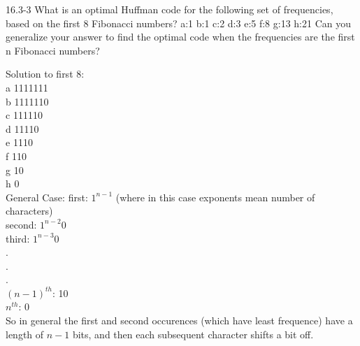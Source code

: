 \newpage \begin{problem}{16.3-3}
  What is an optimal Huffman code for the following set of frequencies, based on the first 8 Fibonacci numbers?
  \br
  a:1 b:1 c:2 d:3 e:5 f:8 g:13 h:21
  \br
  Can you generalize your answer to find the optimal code when the frequencies are the first n Fibonacci numbers?
  \begin{solution}
    Solution to first 8: \\
    a 1111111 \\
    b 1111110 \\
    c 111110 \\
    d 11110 \\
    e 1110 \\
    f 110 \\
    g 10 \\
    h 0\\
    General Case:
    \br
    first: $1^{n-1}$ (where in this case exponents mean number of characters) \\
    second: $1^{n-2}0$ \\
    third: $1^{n-3}0$ \\
    . \\
    . \\
    . \\
    $(n-1)^{th}$: 10 \\
    $n^{th}$: 0 \\
    So in general the first and second occurences (which have least frequence) have a length of $n-1$ bits, and then each subsequent character shifts a bit off.
  \end{solution}
\end{problem}



